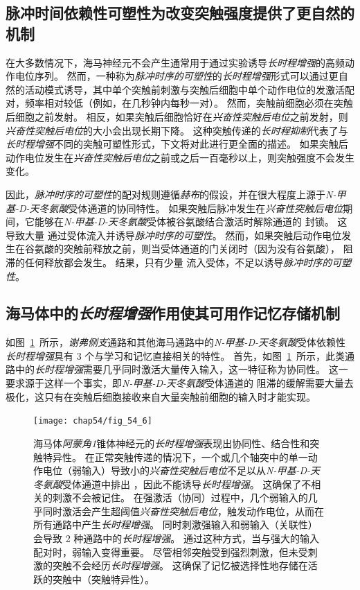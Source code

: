 \subsection{脉冲时间依赖性可塑性为改变突触强度提供了更自然的机制}

在大多数情况下，海马神经元不会产生通常用于通过实验诱导\textit{长时程增强}的高频动作电位序列。
然而，一种称为\textit{脉冲时序的可塑性}的\textit{长时程增强}形式可以通过更自然的活动模式诱导，其中单个突触前刺激与突触后细胞中单个动作电位的发激活配对，频率相对较低（例如，在几秒钟内每秒一对）。
然而，突触前细胞必须在突触后细胞之前发射。
相反，如果突触后细胞恰好在\textit{兴奋性突触后电位}之前发射，则\textit{兴奋性突触后电位}的大小会出现长期下降。
这种突触传递的\textit{长时程抑制}代表了与\textit{长时程增强}不同的突触可塑性形式，下文将对此进行更全面的描述。
如果突触后动作电位发生在\textit{兴奋性突触后电位}之前或之后一百毫秒以上，则突触强度不会发生变化。


因此，\textit{脉冲时序的可塑性}的配对规则遵循\textit{赫布}的假设，并在很大程度上源于\textit{N-甲基-D-天冬氨酸}受体通道的协同特性。
如果突触后脉冲发生在\textit{兴奋性突触后电位}期间，它能够在\textit{N-甲基-D-天冬氨酸}受体被谷氨酸结合激活时解除通道的  封锁。
这导致大量  通过受体流入并诱导\textit{脉冲时序的可塑性}。
然而，如果突触后动作电位发生在谷氨酸的突触前释放之前，则当受体通道的门关闭时（因为没有谷氨酸）， 阻滞的任何释放都会发生。
结果，只有少量  流入受体，不足以诱导\textit{脉冲时序的可塑性}。



\subsection{海马体中的\textit{长时程增强}作用使其可用作记忆存储机制}

如图~\ref{fig:54_6}~所示，\textit{谢弗侧支}通路和其他海马通路中的\textit{N-甲基-D-天冬氨酸}受体依赖性\textit{长时程增强}具有 3 个与学习和记忆直接相关的特性。
首先，如图~\ref{fig:54_6}~所示，此类通路中的\textit{长时程增强}需要几乎同时激活大量传入输入，这一特征称为协同性。
这一要求源于这样一个事实，即\textit{N-甲基-D-天冬氨酸}受体通道的  阻滞的缓解需要大量去极化，这只有在突触后细胞接收来自大量突触前细胞的输入时才能实现。


\begin{figure}[htbp]
	\centering
	\texttt{[image: chap54/fig\_54\_6]}
	\caption{海马体\textit{阿蒙角1}锥体神经元的\textit{长时程增强}表现出协同性、结合性和突触特异性。
		在正常突触传递的情况下，一个或几个轴突中的单一动作电位（弱输入）导致小的\textit{兴奋性突触后电位}不足以从\textit{N-甲基-D-天冬氨酸}受体通道中排出 ，因此不能诱导\textit{长时程增强}。
		这确保了不相关的刺激不会被记住。 
		在强激活（协同）过程中，几个弱输入的几乎同时激活会产生超阈值\textit{兴奋性突触后电位}，触发动作电位，从而在所有通路中产生\textit{长时程增强}。
		同时刺激强输入和弱输入（关联性）会导致 2 种通路中的\textit{长时程增强}。
		通过这种方式，当与强大的输入配对时，弱输入变得重要。
		尽管相邻突触受到强烈刺激，但未受刺激的突触不会经历\textit{长时程增强}。
		这确保了记忆被选择性地存储在活跃的突触中（突触特异性）。}
	\label{fig:54_6}
\end{figure}


